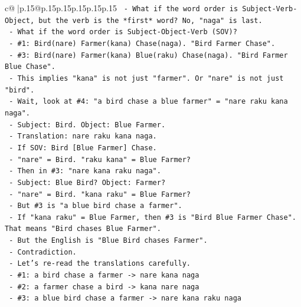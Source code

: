 \documentclass{article}
\begin{document}
{\begin{supertabular}{c@{$\;$}|p{.15\linewidth}@{}p{.15\linewidth}p{.15\linewidth}p{.15\linewidth}p{.15\linewidth}p{.15\linewidth}}
{{{\texttt{               {-} What if the word order is Subject{-}Verb{-}Object, but the verb is the *first* word? No, "naga" is last.} \\
\texttt{               {-} What if the word order is Subject{-}Object{-}Verb (SOV)?} \\
\texttt{                 {-} \#1: Bird(nare) Farmer(kana) Chase(naga). "Bird Farmer Chase".} \\
\texttt{                 {-} \#3: Bird(nare) Farmer(kana) Blue(raku) Chase(naga). "Bird Farmer Blue Chase".} \\
\texttt{                 {-} This implies "kana" is not just "farmer". Or "nare" is not just "bird".} \\
\texttt{                 {-} Wait, look at \#4: "a bird chase a blue farmer" = "nare raku kana naga".} \\
\texttt{                   {-} Subject: Bird. Object: Blue Farmer.} \\
\texttt{                   {-} Translation: nare raku kana naga.} \\
\texttt{                   {-} If SOV: Bird {[}Blue Farmer{]} Chase.} \\
\texttt{                   {-} "nare" = Bird. "raku kana" = Blue Farmer?} \\
\texttt{                   {-} Then in \#3: "nare kana raku naga".} \\
\texttt{                   {-} Subject: Blue Bird? Object: Farmer?} \\
\texttt{                   {-} "nare" = Bird. "kana raku" = Blue Farmer?} \\
\texttt{                   {-} But \#3 is "a blue bird chase a farmer".} \\
\texttt{                   {-} If "kana raku" = Blue Farmer, then \#3 is "Bird Blue Farmer Chase". That means "Bird chases Blue Farmer".} \\
\texttt{                   {-} But the English is "Blue Bird chases Farmer".} \\
\texttt{                   {-} Contradiction.} \\
\texttt{                   {-} Let's re{-}read the translations carefully.} \\
\texttt{                   {-} \#1: a bird chase a farmer {-}> nare kana naga} \\
\texttt{                   {-} \#2: a farmer chase a bird {-}> kana nare naga} \\
\texttt{                   {-} \#3: a blue bird chase a farmer {-}> nare kana raku naga} \\
}}}
\end{supertabular}}
\end{document}
